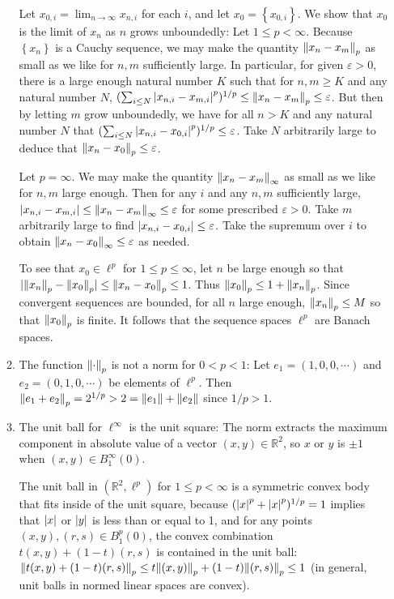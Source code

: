 \documentclass[11pt,leqno]{article}
\theoremstyle{plain}
\theoremstyle{definition}
\numberwithin{equation}{section}
\numberwithin{lem}{section}
\newcommand{\cbr}[1]{\left\{#1\right\}}
\begin{document}
\begin{enumerate}
\begin{enumerate}
    Let $x_{0,i} = \lim_{n\to\infty} x_{n,i}$ for each $i$, and let $x_0 = \cbr{x_{0,i}}$. We show that $x_0$ is the limit of $x_n$ as $n$ grows unboundedly: Let $1\leq p < \infty$. Because $\cbr{x_n}$ is a Cauchy sequence, we may make the quantity $\norm{x_n-x_m}_p$ as small as we like for $n,m$ sufficiently large. In particular, for given $\varepsilon>0$, there is a large enough natural number $K$ such that for $n,m\geq K$ and any natural number $N$, $(\sum_{i\leq N}\abs{x_{n,i} - x_{m,i}}^p)^{1/p}\leq \norm{x_n-x_m}_p\leq \varepsilon$. But then by letting $m$ grow unboundedly, we have for all $n>K$ and any natural number $N$ that $(\sum_{i\leq N}\abs{x_{n,i} - x_{0,i}}^p)^{1/p} \leq \varepsilon$. Take $N$ arbitrarily large to deduce that $\norm{x_n-x_0}_p \leq \varepsilon$. 
    
    Let $p = \infty$. We may make the quantity $\norm{x_n-x_m}_\infty$ as small as we like for $n,m$ large enough. Then for any $i$ and any $n,m$ sufficiently large, $\abs{x_{n,i}-x_{m,i}}\leq \norm{x_n-x_m}_\infty\leq \varepsilon$ for some prescribed $\varepsilon>0$. Take $m$ arbitrarily large to find $\abs{x_{n,i}-x_{0,i}}\leq\varepsilon$. Take the supremum over $i$ to obtain $\norm{x_n-x_0}_\infty\leq \varepsilon$ as needed.

    To see that $x_0\in \ell^p$ for $1\leq p \leq \infty$, let $n$ be large enough so that $|\norm{x_n}_p-\norm{x_0}_p|\leq \norm{x_n-x_0}_p\leq 1$. Thus $\norm{x_0}_p\leq 1 + \norm{x_n}_p$. Since convergent sequences are bounded, for all $n$ large enough, $\norm{x_n}_p\leq M$ so that $\norm{x_0}_p$ is finite. It follows that the sequence spaces $\ell^p$ are Banach spaces.
    
    \item The function $\norm{\cdot}_p$ is not a norm for $0<p<1$: Let $e_1 = (1,0,0,\cdots)$ and $e_2 = (0,1,0,\cdots)$ be elements of $\ell^p$. Then $\norm{e_1+e_2}_p = 2^{1/p}>2 = \norm{e_1} + \norm{e_2}$ since $1/p>1$.
    
    \item The unit ball for $\ell^\infty$ is the unit square: The norm extracts the maximum component in absolute value of a vector $(x,y)\in \mathbb R^2$, so $x$ or $y$ is $\pm 1$ when $(x,y)\in B_1^\infty(0)$.

    The unit ball in $(\mathbb R^2,\ell^p)$ for $1\leq p <\infty$ is a symmetric convex body that fits inside of the unit square, because $(\abs{x}^p+\abs{x}^p)^{1/p} = 1$ implies that $\abs{x}$ or $\abs{y}$ is less than or equal to 1, and for any points $(x,y),(r,s)\in B_1^p(0)$, the convex combination $t(x,y) + (1-t)(r,s)$ is contained in the unit ball: $\norm{t(x,y) + (1-t)(r,s)}_p\leq t\norm{(x,y)}_p + (1-t)\norm{(r,s)}_p\leq 1$ (in general, unit balls in normed linear spaces are convex).


\end{enumerate}
\end{enumerate}
\end{document}
